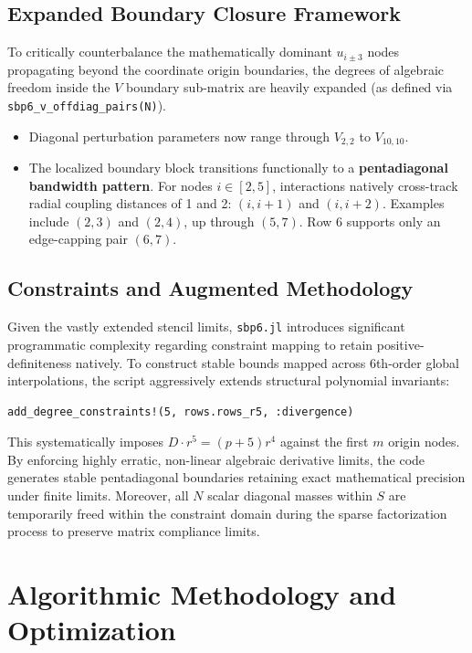 \documentclass[reprint,amsmath,amssymb,aps]{revtex4-2}
\begin{document}
\subsection{Expanded Boundary Closure Framework}
To critically counterbalance the mathematically dominant $u_{i \pm 3}$ nodes propagating beyond the coordinate origin boundaries, the degrees of algebraic freedom inside the $V$ boundary sub-matrix are heavily expanded (as defined via \texttt{sbp6\_v\_offdiag\_pairs(N)}).
\begin{itemize}
    \item Diagonal perturbation parameters now range through $V_{2,2}$ to \textbf{$V_{10,10}$}.
    \item The localized boundary block transitions functionally to a \textbf{pentadiagonal bandwidth pattern}. For nodes $i \in [2,5]$, interactions natively cross-track radial coupling distances of 1 and 2: $(i, i+1)$ and $(i, i+2)$. Examples include $(2,3)$ and $(2,4)$, up through $(5,7)$. Row 6 supports only an edge-capping pair $(6,7)$.
\end{itemize}

\subsection{Constraints and Augmented Methodology}
Given the vastly extended stencil limits, \texttt{sbp6.jl} introduces significant programmatic complexity regarding constraint mapping to retain positive-definiteness natively. To construct stable bounds mapped across 6th-order global interpolations, the script aggressively extends structural polynomial invariants:
\begin{verbatim}
add_degree_constraints!(5, rows.rows_r5, :divergence)
\end{verbatim}
This systematically imposes $D \cdot r^5 = (p+5)r^4$ against the first $m$ origin nodes. By enforcing highly erratic, non-linear algebraic derivative limits, the code generates stable pentadiagonal boundaries retaining exact mathematical precision under finite limits. Moreover, all $N$ scalar diagonal masses within $S$ are temporarily freed within the constraint domain during the sparse factorization process to preserve matrix compliance limits.


\section{Algorithmic Methodology and Optimization}
\end{document}
